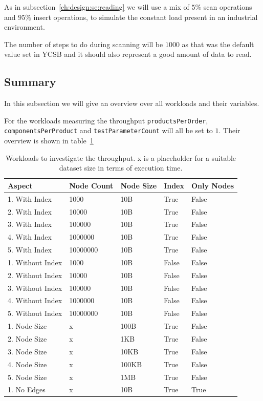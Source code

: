 As in subsection~\ref{ch:design:se:reading} we will use a mix of $ 5\% $ scan operations and $ 95\% $ insert operations,
to simulate the constant load present in an industrial environment.

The number of steps to do during scanning will be $ 1000 $ as that was the default value set in YCSB and it should also represent a good amount of data to read.

\subsection{Summary}
\label{ch:design:se:summary}
In this subsection we will give an overview over all workloads and their variables.

For the workloads measuring the throughput \texttt{productsPerOrder},
\texttt{componentsPerProduct} and \texttt{testParameterCount} will all be set to $ 1 $.
Their overview is shown in table~\ref{tab:throughput}

\begin{table}[!h]
  \begin{minipage}{\textwidth}
    \begin{tabularx}{\textwidth}{ | X | X | X | X | X | }
      \hline
      Aspect & Node Count & Node Size & Index & Only Nodes \\ \hline
      1. With Index & 1000 & 10B & True & False \\ \hline
      2. With Index & 10000 & 10B & True & False \\ \hline
      3. With Index & 100000 & 10B & True & False \\ \hline
      4. With Index & 1000000 & 10B & True & False \\ \hline
      5. With Index & 10000000 & 10B & True & False \\ \hline
      1. Without Index & 1000 & 10B & False & False \\ \hline
      2. Without Index & 10000 & 10B & False & False \\ \hline
      3. Without Index & 100000 & 10B & False & False \\ \hline
      4. Without Index & 1000000 & 10B & False & False \\ \hline
      5. Without Index & 10000000 & 10B & False & False \\ \hline
      1. Node Size & x & 100B & True & False \\ \hline
      2. Node Size & x & 1KB & True & False \\ \hline
      3. Node Size & x & 10KB & True & False \\ \hline
      4. Node Size & x & 100KB & True & False \\ \hline
      5. Node Size & x & 1MB & True & False \\ \hline
      1. No Edges & x & 10B & True & True \\ \hline
    \end{tabularx}
  \end{minipage}
  \caption{Workloads to investigate the throughput. x is a placeholder for a suitable dataset size in terms of execution time.}
  \label{tab:throughput}
\end{table}

